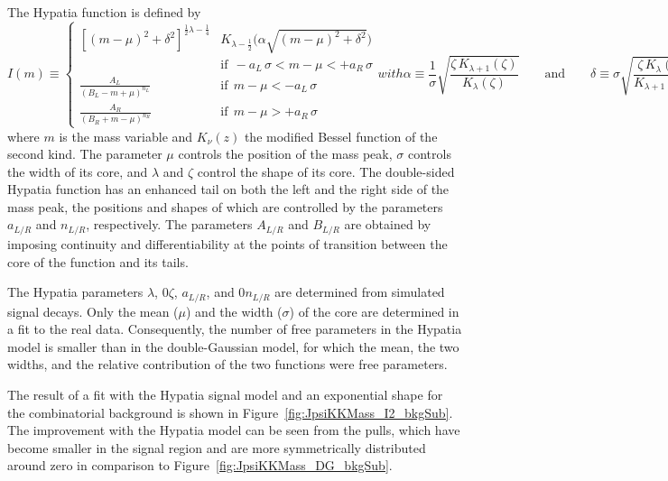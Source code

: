 The Hypatia function is defined by
\begin{subequations}
\begin{equation}
  I(m) \equiv
  \begin{cases}
    \left[(m-\mu)^{2} + \delta^{2}\right]^{\frac{1}{2} \lambda - \frac{1}{4}}
          \!\!\!\!& K_{\lambda - \frac{1}{2}}\big(\alpha \sqrt{(m-\mu)^2 + \delta^2}\big) \\
          &\text{if}\ \ -a_L\,\sigma < m - \mu < +a_R\,\sigma \\
    \frac{A_L}{(B_L - m+\mu)^{n_L}} &\text{if}\ \ m - \mu < -a_L\,\sigma \\
    \frac{A_R}{(B_R + m-\mu)^{n_R}} &\text{if}\ \ m - \mu > +a_R\,\sigma
  \end{cases}
\end{equation}
with
\begin{equation}
  \alpha\equiv\frac{1}{\sigma}\sqrt{\frac{\zeta\, K_{\lambda+1}(\zeta)}{K_\lambda(\zeta)}}
  \qquad\text{and}\qquad
  \delta\equiv\sigma\sqrt{\frac{\zeta\,K_\lambda(\zeta)}{K_{\lambda+1}(\zeta)}} \ ,
\end{equation}
\end{subequations}
where $m$ is the mass variable and $K_{\nu}(z)$ the modified Bessel function of the second kind. The parameter $\mu$ controls the position
of the mass peak, $\sigma$ controls the width of its core, and $\lambda$ and $\zeta$ control the shape of its core. The double-sided
Hypatia function has an enhanced tail on both the left and the right side of the mass peak, the positions and shapes of which are
controlled by the parameters $a_{L/R}$ and $n_{L/R}$, respectively. The parameters $A_{L/R}$ and $B_{L/R}$ are obtained by imposing
continuity and differentiability at the points of transition between the core of the function and its tails.

The Hypatia parameters $\lambda$\textapprox{}, 0\textlt$\zeta$, $a_{L/R}$, and 0\textlt$n_{L/R}$ are
determined from simulated \BstoJpsiphi{} signal decays. Only the mean ($\mu$\unitsp\MeV) and the width
($\sigma$\unitsp\MeV) of the core are determined in a fit to the real data. Consequently, the number of free parameters in the
Hypatia model is smaller than in the double-Gaussian model, for which the mean, the two widths, and the relative contribution of the two
functions were free parameters.

The result of a fit with the Hypatia signal model and an exponential shape for the combinatorial background is shown in
Figure~\ref{fig:JpsiKKMass_I2_bkgSub}. The improvement with the Hypatia model can be seen from the pulls, which have become smaller in
the signal region and are more symmetrically distributed around zero in comparison to Figure~\ref{fig:JpsiKKMass_DG_bkgSub}.

